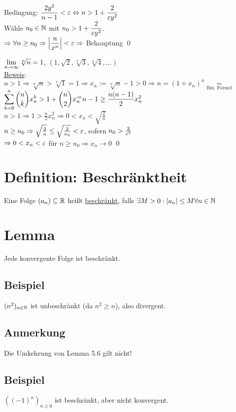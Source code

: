 {Bedingung: $\displaystyle\frac{2y^2}{n-1} < \varepsilon \Leftrightarrow n > 1 + \displaystyle\frac{2}{\varepsilon y^2}$\\
Wähle $n_0 \in \mathbb{N}$ mit $n_0 > 1 + \displaystyle\frac{2}{\varepsilon y^2}$.\\
$\Rightarrow \forall n \ge n_0 \Rightarrow \left|\displaystyle\frac{n}{x^n}\right| < \varepsilon \Rightarrow$ Behauptung \qed
\item $\displaystyle\lim_{n \to \infty} \sqrt[n]{n} = 1$, $(1,\sqrt{2},\sqrt[3]{3},\sqrt[4]{4},\hdots)$\\
\underline{Beweis}: $n > 1 \Rightarrow \sqrt[n]{n} > \sqrt[n]{1} = 1 \Rightarrow x_n := \sqrt[n]{n} - 1 > 0 \Rightarrow n=(1+x_n)^n \underset{\text{Bin. Formel}}{=}$\\
$\displaystyle\sum_{k=0}^n \displaystyle\binom{n}{k} x_n^k > 1+\displaystyle\binom{n}{2} x_n^ \Rightarrow n-1 \ge \displaystyle\frac{n(n-1)}{2} x_n^2$\\
$n > 1 \Rightarrow 1 > \frac{n}{2} x_n^2 \Rightarrow 0 < x_n < \sqrt{\frac{2}{n}}$\\
$n \ge n_0 \Rightarrow \sqrt{\frac{2}{n}} \le \sqrt{\frac{2}{n_0}} < \varepsilon$, sofern $n_0 > \frac{2}{\varepsilon^2}$\\
$\Rightarrow 0 < x_n < \varepsilon$ für $n \ge n_0 \Rightarrow x_n \to 0$ \qed 
}

\newpage

\section{Definition: Beschränktheit}\label{5.5}
Eine Folge $(a_n) \subseteq \mathbb{R}$ heißt \underline{beschränkt}, falls $\exists M > 0 : |a_n| \le M \forall n \in \mathbb{N}$

\section{Lemma}\label{5.6}
Jede konvergente Folge ist beschränkt.

\subsection*{Beispiel}
$(n^2)_{n \in \mathbb{N}}$ ist unbeschränkt (da $n^2 \ge n$), also divergent.

\subsection*{Anmerkung}
Die Umkehrung von Lemma 5.6 gilt nicht!

\subsection*{Beispiel}
$((-1)^n)_{n \ge 0}$ ist beschränkt, aber nicht konvergent.


